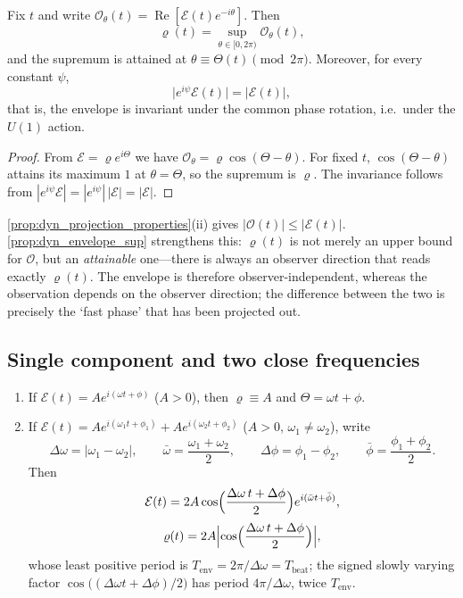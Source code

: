 \begin{proposition}\label{prop:dyn_envelope_sup}
Fix $t$ and write $\mathcal O_\theta(t)=\operatorname{Re}[\mathcal E(t)e^{-i\theta}]$. Then
\[
\varrho(t)=\sup_{\theta\in[0,2\pi)}\mathcal O_\theta(t),
\]
and the supremum is attained at $\theta\equiv\Theta(t)\pmod{2\pi}$. Moreover, for every constant $\psi$,
\[
\bigl|e^{i\psi}\mathcal E(t)\bigr|=|\mathcal E(t)|,
\]
that is, the envelope is invariant under the common phase rotation, i.e.\ under the $U(1)$ action.
\end{proposition}

\begin{proof}
From $\mathcal E=\varrho e^{i\Theta}$ we have $\mathcal O_\theta=\varrho\cos(\Theta-\theta)$. For fixed $t$, $\cos(\Theta-\theta)$ attains its maximum $1$ at $\theta=\Theta$, so the supremum is $\varrho$. The invariance follows from $|e^{i\psi}\mathcal E|=|e^{i\psi}|\,|\mathcal E|=|\mathcal E|$.
\end{proof}

\begin{remark}\label{rem:dyn_envelope_vs_projection}
\cref{prop:dyn_projection_properties}(ii) gives $|\mathcal O(t)|\le|\mathcal E(t)|$. \cref{prop:dyn_envelope_sup} strengthens this: $\varrho(t)$ is not merely an upper bound for $\mathcal O$, but an \emph{attainable} one---there is always an observer direction that reads exactly $\varrho(t)$. The envelope is therefore observer-independent, whereas the observation depends on the observer direction; the difference between the two is precisely the `fast phase' that has been projected out.
\end{remark}

\subsection{Single component and two close frequencies}

\begin{proposition}\label{prop:dyn_envelope_beat}
\begin{enumerate}[label=(\roman*)]
    \item If $\mathcal E(t)=Ae^{i(\omega t+\phi)}$ ($A>0$), then $\varrho\equiv A$ and $\Theta=\omega t+\phi$.
    \item If $\mathcal E(t)=Ae^{i(\omega_1t+\phi_1)}+Ae^{i(\omega_2t+\phi_2)}$ ($A>0$, $\omega_1\neq\omega_2$), write
    \[
    \Delta\omega=|\omega_1-\omega_2|,\qquad \bar\omega=\frac{\omega_1+\omega_2}{2},\qquad \Delta\phi=\phi_1-\phi_2,\qquad \bar\phi=\frac{\phi_1+\phi_2}{2}.
    \]
    Then
    \[
    \mathcal E(t)=2A\cos\Bigl(\frac{\Delta\omega\,t+\Delta\phi}{2}\Bigr)e^{i(\bar\omega t+\bar\phi)},
    \]
    \[
    \varrho(t)=2A\Bigl|\cos\Bigl(\frac{\Delta\omega\,t+\Delta\phi}{2}\Bigr)\Bigr|,
    \]
    whose least positive period is $T_{\text{env}}=2\pi/\Delta\omega=T_{\text{beat}}$; the signed slowly varying factor $\cos\bigl((\Delta\omega t+\Delta\phi)/2\bigr)$ has period $4\pi/\Delta\omega$, twice $T_{\text{env}}$.
\end{enumerate}
\end{proposition}

